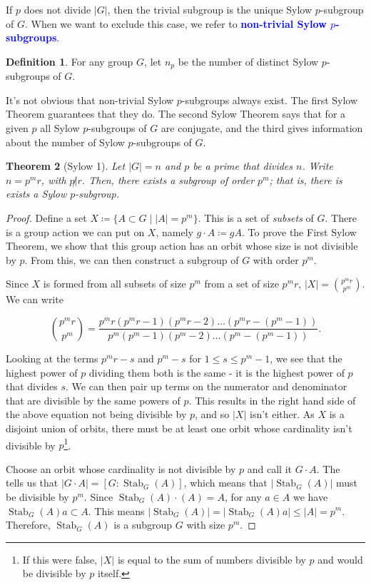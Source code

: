 \documentclass[12pt]{report}
\newcommand{\indx}[1]{\index{#1}\textbf{\textcolor{blue}{#1}}}
\newcommand{\Stab}{\operatorname{Stab}}
\newtheorem{theorem}{Theorem}[section] %
\theoremstyle{definition}
\newtheorem{definition}[theorem]{Definition}
\begin{document}
If \(p\) does not divide \(|G|\), then the trivial subgroup is the unique Sylow \(p\)-subgroup of \(G\). When we want to exclude this case, we refer to \indx{non-trivial Sylow \(p\)-subgroups}.

\begin{definition}
  For any group \(G\), let \(n_{p}\) be the number of distinct Sylow \(p\)-subgroups of \(G\).
\end{definition}

It's not obvious that non-trivial Sylow \(p\)-subgroups always exist. The first Sylow Theorem guarantees that they do. The second Sylow Theorem says that for a given \(p\) all Sylow \(p\)-subgroups of \(G\) are conjugate, and the third gives information about the number of Sylow \(p\)-subgroups of \(G\).

\begin{theorem}[Sylow 1]\label{thm:group-theory:Sylow-1}
  Let \(|G| = n\) and \(p\) be a prime that divides \(n\). Write \(n = p^{m}r\), with \(p \not| r\). Then, there exists a subgroup of order \(p^{m}\); that is, there is exists a Sylow \(p\)-subgroup.
\end{theorem}

\begin{proof}
  Define a set \(X \coloneqq \{ A \subset G \mid |A| = p^{m}\}\). This is a set of \textit{subsets} of \(G\). There is a group action we can put on \(X\), namely \(g \cdot A \coloneqq gA\). To prove the First Sylow Theorem, we show that this group action has an orbit whose size is not divisible by \(p\). From this, we can then construct a subgroup of \(G\) with order \(p^{m}\).

  Since \(X\) is formed from all subsets of size \(p^{m}\) from a set of size \(p^{m} r\), \(|X| = {p^{m}r \choose p^{m}}\). We can write

  \[{p^{m}r \choose p^{m}} = \frac{p^{m}r(p^{m}r-1)(p^{m}r -2) \ldots (p^{m}r - (p^{m}-1))}{p^{m}(p^{m} - 1)(p^{m} - 2)\ldots(p^{m} - (p^{m} - 1))}.\]

  Looking at the terms \(p^{m}r - s\) and \(p^{m} - s\) for \(1 \leq s \leq p^{m}-1\), we see that the highest power of \(p\) dividing them both is the same - it is the highest power of \(p\) that divides \(s\). We can then pair up terms on the numerator and denominator that are divisible by the same powers of \(p\). This results in the right hand side of the above equation not being divisible by \(p\), and so \(|X|\) isn't either. As \(X\) is a disjoint union of orbits, there must be at least one orbit whose cardinality isn't divisible by \(p\)\footnote{If this were false, \(|X|\) is equal to the sum of numbers divisible by \(p\) and would be divisible by \(p\) itself.}.

  Choose an orbit whose cardinality is not divisible by \(p\) and call it \(G \cdot A\). The~ tells us that \(|G \cdot A| = [G : \Stab_{G}(A)]\), which means that \(|\Stab_{G}(A)|\) must be divisible by \(p^{m}\). Since \(\Stab_{G}(A) \cdot (A) = A\), for any \(a \in A\) we have \(\Stab_{G}(A)a \subset A\). This means \(|\Stab_{G}(A)| = |\Stab_{G}(A)a| \leq |A| = p^{m}\). Therefore, \(\Stab_{G}(A)\) is a subgroup \(G\) with size \(p^{m}\).
\end{proof}
\end{document}
